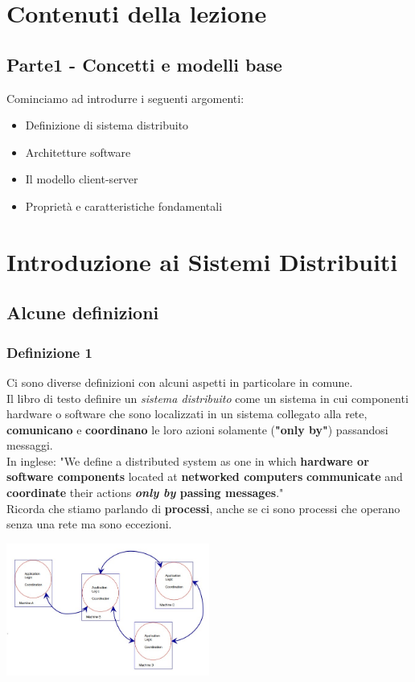 \chapter{Contenuti della lezione}

\section{Parte1 - Concetti e modelli base}
Cominciamo ad introdurre i seguenti argomenti:
\begin{itemize}
    \item Definizione di sistema distribuito
    \item Architetture software
    \item Il modello client-server
    \item Proprietà e caratteristiche fondamentali
    
\end{itemize}

\chapter{Introduzione ai Sistemi Distribuiti}

\section{Alcune definizioni}
\subsection{Definizione 1}
Ci sono diverse definizioni con alcuni aspetti in particolare in comune.
\\Il libro di testo definire un \textit{sistema distribuito} come un sistema in cui componenti hardware o software che sono localizzati in un sistema collegato alla rete, \textbf{comunicano} e \textbf{coordinano} le loro azioni solamente (\textbf{"only by"}) passandosi messaggi.
\\In inglese: "We define a distributed system as one in which \textbf{hardware or software components} located at \textbf{networked computers} \textbf{communicate} and \textbf{coordinate} their actions \textbf{\textit{only by} passing messages}."
\\Ricorda che stiamo parlando di \textbf{processi}, anche se ci sono processi che operano senza una rete ma sono eccezioni.
\begin{center}
    \includegraphics[width=0.5\textwidth]{img/lez28022023_def1.jpg}
\end{center}

